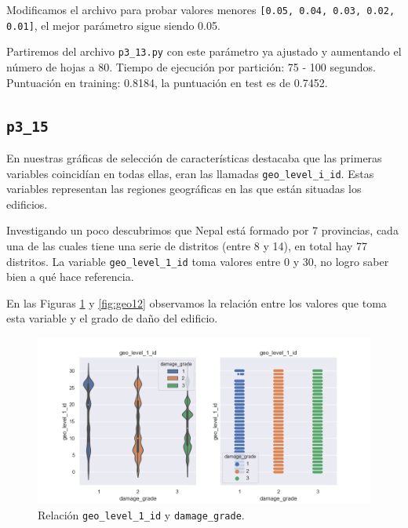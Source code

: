 \documentclass[a4paper, 20pt]{article}
\begin{document}
Modificamos el archivo para probar valores menores \texttt{[0.05, 0.04, 0.03, 0.02, 0.01]}, el mejor parámetro sigue siendo 0.05.

Partiremos del archivo \texttt{p3\_13.py} con este parámetro ya ajustado y aumentando el número de hojas a 80. Tiempo de ejecución por partición: 75 - 100 segundos. Puntuación en training: 0.8184, la puntuación en test es de 0.7452.

\subsection{\texttt{p3\_15}}

En nuestras gráficas de selección de características destacaba que las primeras variables coincidían en todas ellas, eran las llamadas \texttt{geo\_level\_i\_id}. Estas variables representan las regiones geográficas en las que están situadas los edificios.

Investigando un poco descubrimos que Nepal está formado por 7 provincias, cada una de las cuales tiene una serie de distritos (entre 8 y 14), en total hay 77 distritos. La variable \texttt{geo\_level\_1\_id} toma valores entre 0 y 30, no logro saber bien a qué hace referencia.

En las Figuras \ref{fig:geo11} y \ref{fig:geo12} observamos la relación entre los valores que toma esta variable y el grado de daño del edificio.

\begin{figure}[H]
    \centering
    \includegraphics[height=0.9\textwidth, width=1.0\textwidth]{geo_level_1_1}
    \caption{Relación \texttt{geo\_level\_1\_id} y \texttt{damage\_grade}.}
    \label{fig:geo11}
\end{figure}
\end{document}
